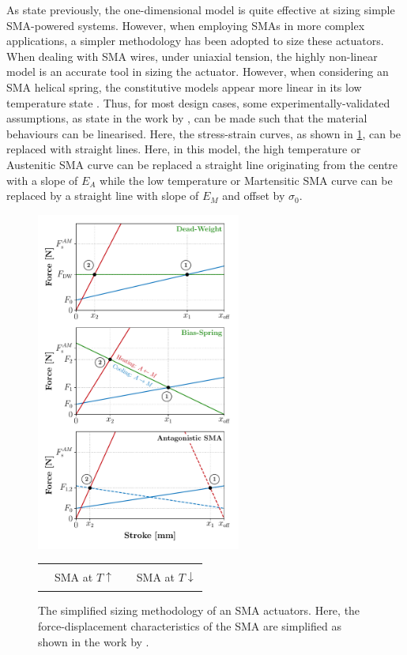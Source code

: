 As state previously, the one-dimensional model is quite effective at sizing simple SMA-powered systems. However, when employing SMAs in more complex applications, a simpler methodology has been adopted to size these actuators. When dealing with SMA wires, under uniaxial tension, the highly non-linear \cite{brinsonOneDimensionalConstitutiveBehavior1993} model is an accurate tool in sizing the actuator. However, when considering an SMA helical spring, the constitutive models appear more linear in its low temperature state \todocite. Thus, for most design cases, some experimentally-validated assumptions, as state in the work by \cite{dragoniDesignDevelopmentAdvanced2021}, can be made such that the material behaviours can be linearised. Here, the stress-strain curves, as shown in \cref{fig:simplied-sma-bias-spring-wp}, can be replaced with straight lines. Here, in this model, the high temperature or Austenitic SMA curve can be replaced a straight line originating from the centre with a slope of $E_A$ while the low temperature or Martensitic SMA curve can be replaced by a straight line with slope of $E_M$ and offset by $\sigma_0$.
\begin{figure}[hbt]
    \centering
    \includegraphics[width=0.6\textwidth]{images/chap2/simplied-sma-bias-all-wp.pdf}

    \begin{tabular}{l@{ }l l@{ }l}
      {\color{myred} \rule[2pt]{10pt}{0.5mm} } & {\footnotesize SMA at $T\uparrow$} & {\color{myblue} \rule[2pt]{10pt}{0.5mm} } & {\footnotesize SMA at $T\downarrow$}\\
    \end{tabular}
    \caption{The simplified sizing methodology of an SMA actuators. Here, the force-displacement characteristics of the SMA are simplified as shown in the work by \todocite.}
    \label{fig:simplied-sma-bias-spring-wp}
\end{figure}

